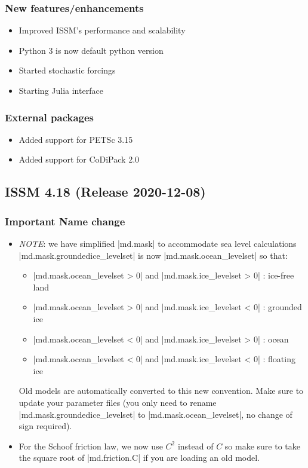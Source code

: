\subsubsection{New features/enhancements}
\begin{itemize}
\item Improved ISSM's performance and scalability
\item Python 3 is now default python version
\item Started stochastic forcings
\item Starting Julia interface
\end{itemize}
\subsubsection{External packages}
\begin{itemize}
\item Added support for PETSc 3.15
\item Added support for CoDiPack 2.0
\end{itemize}

\subsection*{ISSM 4.18 (Release 2020-12-08)}
\subsubsection{Important Name change}
\begin{itemize}
\item \emph{NOTE}: we have simplified \lstinlinebg|md.mask| to accommodate sea level calculations \lstinlinebg|md.mask.groundedice_levelset| is now \lstinlinebg|md.mask.ocean_levelset| so that:
\begin{itemize}
\item \lstinlinebg|md.mask.ocean_levelset > 0| and \lstinlinebg|md.mask.ice_levelset > 0| : ice-free land
\item \lstinlinebg|md.mask.ocean_levelset > 0| and \lstinlinebg|md.mask.ice_levelset < 0| : grounded ice
\item \lstinlinebg|md.mask.ocean_levelset < 0| and \lstinlinebg|md.mask.ice_levelset > 0| : ocean
\item \lstinlinebg|md.mask.ocean_levelset < 0| and \lstinlinebg|md.mask.ice_levelset < 0| : floating ice
\end{itemize}
Old models are automatically converted to this new convention. Make sure to update your parameter files (you only need to rename \lstinlinebg|md.mask.groundedice_levelset| to \lstinlinebg|md.mask.ocean_levelset|, no change of sign required).
\end{itemize}
\begin{itemize}
\item For the Schoof friction law, we now use $C^2$ instead of $C$ so make sure to take the square root of \lstinlinebg|md.friction.C| if you are loading an old model.
\end{itemize}
